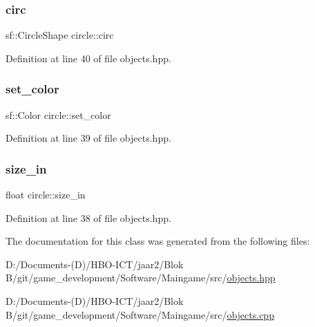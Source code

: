 \subsubsection{\texorpdfstring{circ}{circ}}
{\footnotesize\ttfamily sf\+::\+Circle\+Shape circle\+::circ\hspace{0.3cm}{\ttfamily [private]}}



Definition at line 40 of file objects.\+hpp.

\mbox{\label{classcircle_a5799c9f87886fe5c27a4386a491b54ea}} 
\subsubsection{\texorpdfstring{set\+\_\+color}{set\_color}}
{\footnotesize\ttfamily sf\+::\+Color circle\+::set\+\_\+color\hspace{0.3cm}{\ttfamily [private]}}



Definition at line 39 of file objects.\+hpp.

\mbox{\label{classcircle_ae45f54eec971ae74e4d8842300fa4d20}} 
\subsubsection{\texorpdfstring{size\+\_\+in}{size\_in}}
{\footnotesize\ttfamily float circle\+::size\+\_\+in\hspace{0.3cm}{\ttfamily [private]}}



Definition at line 38 of file objects.\+hpp.



The documentation for this class was generated from the following files\+:\begin{DoxyCompactItemize}
\item 
D\+:/\+Documents-\/(\+D)/\+H\+B\+O-\/\+I\+C\+T/jaar2/\+Blok B/git/game\+\_\+development/\+Software/\+Maingame/src/\hyperlink{objects_8hpp}{objects.\+hpp}\item 
D\+:/\+Documents-\/(\+D)/\+H\+B\+O-\/\+I\+C\+T/jaar2/\+Blok B/git/game\+\_\+development/\+Software/\+Maingame/src/\hyperlink{objects_8cpp}{objects.\+cpp}\end{DoxyCompactItemize}

